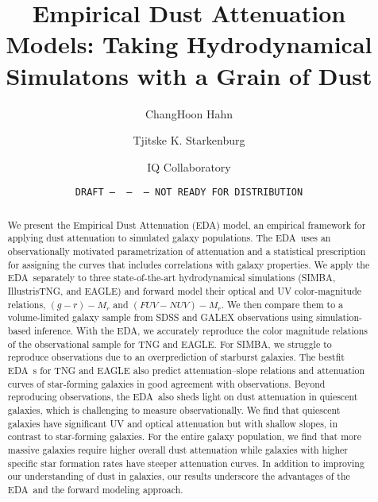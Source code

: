\documentclass[12pt, letterpaper, preprint, comicneue]{aastex63}
\newcommand{\gr}{g{-}r}
\newcommand{\fnuv}{FUV{-}NUV}
\newcommand{\eda}{EDA}
\begin{document}
 \sloppy\sloppypar\frenchspacing 

\title{Empirical Dust Attenuation Models: Taking Hydrodynamical Simulatons with a Grain of Dust}
\date{\texttt{DRAFT~---~\githash~---~\gitdate~---~NOT READY FOR DISTRIBUTION}}

\author{ChangHoon Hahn}

\author{Tjitske K. Starkenburg}

\author{IQ Collaboratory}

\begin{abstract}
    We present the Empirical Dust Attenuation (\eda) model, an empirical
    framework for applying dust attenuation to simulated galaxy populations.
    The \eda~uses an observationally motivated parametrization of attenuation
    and a statistical prescription for assigning the curves that 
    includes correlations with galaxy properties. We apply the \eda~separately
    to three state-of-the-art hydrodynamical simulations (SIMBA,
    IllustrisTNG, and EAGLE) and forward model their optical and UV
    color-magnitude relations, $(\gr) - M_r$ and $(\fnuv)-M_r$. We then compare
    them to a volume-limited galaxy sample from SDSS and GALEX observations
    using simulation-based inference. With the \eda, we accurately reproduce
    the color magnitude relations of the observational sample for TNG and
    EAGLE. For SIMBA, we struggle to reproduce observations due to an overprediction 
    of starburst galaxies. The bestfit \eda~s for TNG and EAGLE also predict
    attenuation--slope relations and attenuation curves of star-forming
    galaxies in good agreement with observations. Beyond reproducing observations,
    the \eda~also sheds light on dust attenuation in quiescent galaxies, which
    is challenging to measure observationally. We find that quiescent galaxies 
    have significant UV and optical attenuation but with shallow slopes, in
    contrast to star-forming galaxies. For the entire galaxy population, we
    find that more massive galaxies require higher overall dust attenuation
    while galaxies with higher specific star formation rates have steeper 
    attenuation curves. In addition to improving our understanding of dust in 
    galaxies, our results underscore the advantages of the \eda~and the forward 
    modeling approach. 
\end{abstract}
\end{document}
